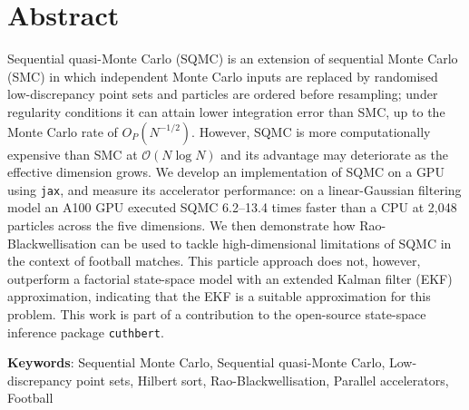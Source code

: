 \chapter*{Abstract}
Sequential quasi-Monte Carlo (SQMC) is an extension of sequential Monte Carlo (SMC) in which independent Monte Carlo inputs are replaced by randomised low-discrepancy point sets and particles are ordered before resampling; under regularity conditions it can attain lower integration error than SMC, up to the Monte Carlo rate of $O_P(N^{-1/2})$. However, SQMC is more computationally expensive than SMC at $\mathcal{O}(N \log N)$ and its advantage may deteriorate as the effective dimension grows. We develop an implementation of SQMC on a GPU using \texttt{jax}, and measure its accelerator performance: on a linear-Gaussian filtering model an A100 GPU executed SQMC 6.2--13.4 times faster than a CPU at 2,048 particles across the five dimensions. We then demonstrate how Rao-Blackwellisation can be used to tackle high-dimensional limitations of SQMC in the context of football matches. This particle approach does not, however, outperform a factorial state-space model with an extended Kalman filter (EKF) approximation, indicating that the EKF is a suitable approximation for this problem. This work is part of a contribution to the open-source state-space inference package \texttt{cuthbert}.

\textbf{Keywords}: Sequential Monte Carlo, Sequential quasi-Monte Carlo, Low-discrepancy point sets, Hilbert sort, Rao-Blackwellisation, Parallel accelerators, Football